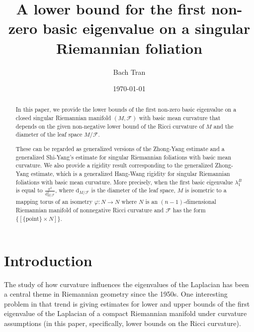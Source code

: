 \documentclass[11pt]{amsart}
\def\d{\mathrm{d}}
\begin{document}
\title{A lower bound for the first non-zero basic eigenvalue on a singular Riemannian foliation}
\author{Bach Tran}
\address{University of Oklahoma\newline
\indent Department of Mathematics\newline
{} Elm Ave\newline
\indent Norman, OK, 73019-3103, USA}
\date{\today}
\begin{abstract}
    In this paper, we provide  the lower bounds of the first non-zero basic eigenvalue on a closed singular Riemannian manifold $(M,\mathcal{F})$ with basic mean curvature that depends on the given non-negative lower bound of the Ricci curvature of $M$ and the diameter of the leaf space $M/\mathcal{F}$.
    
    These can be regarded as generalized versions of the Zhong-Yang estimate and a generalized Shi-Yang's estimate for singular Riemannian foliations with basic mean curvature. We also provide a rigidity result corresponding to the generalized Zhong-Yang estimate, which is a generalized Hang-Wang rigidity for singular Riemannian foliations with basic mean curvature. More precisely, when the first basic eigenvalue $\lambda_1^B$ is equal to $\frac{\pi^2}{\d_{M/\mathcal{F}}^2} $, where $\d_{M/\mathcal{F}}$ is the diameter of the leaf space, $M$ is 
    isometric to a mapping torus of an isometry $\varphi:N\to N$ where $N$ is an $(n-1)$-dimensional Riemannian manifold of nonnegative Ricci curvature and $\mathcal{F}$ has the form $\{[\{\text{point}\}\times N]\}$.
\end{abstract}
\maketitle
\tableofcontents
{}

\section{Introduction}\label{00000}

The study of how curvature influences the eigenvalues of the Laplacian has been a central theme in Riemannian geometry since the 1950s. One interesting problem in that trend is giving estimates for lower and upper bounds of the first eigenvalue of the Laplacian of a compact Riemannian manifold under curvature assumptions (in this paper, specifically, lower bounds on the Ricci curvature).
\end{document}
